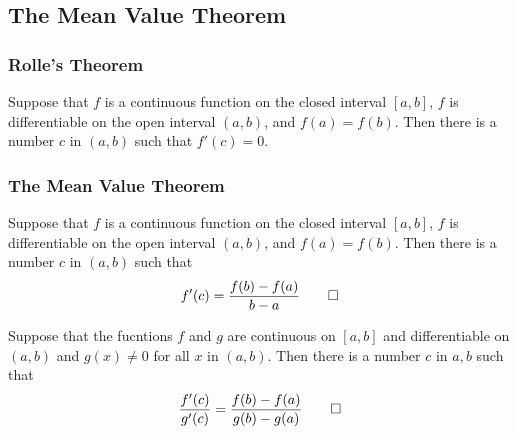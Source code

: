 \subsection{The Mean Value Theorem}

\subsubsection*{Rolle's Theorem}
\begin{theorem}
    Suppose that \(f\) is a continuous function on the closed interval \([a,b]\),
    \(f\) is differentiable on the open interval \((a,b)\), and \(f(a)=f(b)\).
    Then there is a number \(c\) in \((a,b)\) such that \(f'(c)=0\).
\end{theorem}

\subsubsection*{The Mean Value Theorem}
\begin{theorem}
    Suppose that \(f\) is a continuous function on the closed interval \([a,b]\),
    \(f\) is differentiable on the open interval \((a,b)\), and \(f(a)=f(b)\).
    Then there is a number \(c\) in \((a,b)\) such that
    \[f'(c)=\frac{f(b)-f(a)}{b-a}\qedhere\]
\end{theorem}

\begin{theorem}
    Suppose that the fucntions \(f\) and \(g\) are continuous on \([a,b]\) and
    differentiable on \((a,b)\) and \(g(x)\neq 0\) for all \(x\) in \((a,b)\).
    Then there is a number \(c\) in \(a,b\) such that
    \[\frac{f'(c)}{g'(c)}=\frac{f(b)-f(a)}{g(b)-g(a)}\qedhere\]
\end{theorem}